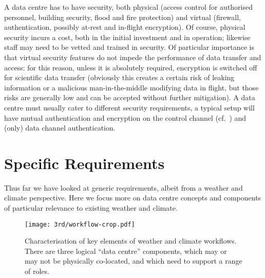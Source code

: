 A data centre has to have security, both physical (access control for authorised
personnel, building security, flood and fire protection) and virtual
(firewall, authentication, possibly at-rest and in-flight encryption).  Of
course, physical security incurs a cost, both in the initial investment and
in operation; likewise staff may need to be vetted and trained in security.  Of
particular importance is that virtual security features do not impede the
performance of data transfer and access: for this reason, unless it is
absolutely required, encryption is switched off for scientific data transfer
(obviously this creates a certain risk of leaking information or a malicious
man-in-the-middle modifying data in flight, but those risks are generally low
and can be accepted without further mitigation).  A data centre must usually
cater to different security requirements,  a typical setup will have mutual
authentication and encryption on the control channel (cf.\ \cite{GridFTP}) and
(only) data channel authentication.

\section{Specific Requirements}
\label{sec:wc_requirements}

Thus far we have looked at generic requirements, albeit from a weather and climate
perspective. Here we focus more on data centre concepts and components of
particular relevance to existing weather and climate.

\begin{figure}
    \centering
    \texttt{[image: 3rd/workflow-crop.pdf]}
    \caption{Characterisation of key elements of weather and climate workflows.
    There are three logical ``data centre'' components, which may or may
    not be physically co-located, and which need to support a range of roles.}
    \label{fig:wc_workflow}
\end{figure}

